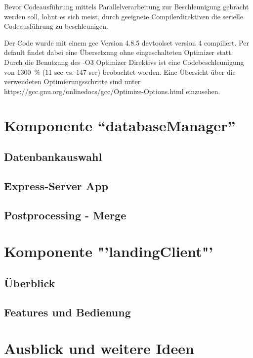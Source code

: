 \documentclass[10pt,a4paper]{report}
\begin{document}
Bevor Codeausführung mittels Parallelverarbeitung zur Beschleunigung gebracht werden soll, lohnt es sich meist, durch geeignete Compilerdirektiven die serielle Codeausführung zu beschleunigen.

Der Code wurde mit einem gcc Version 4.8.5 devtoolset version 4 compiliert. Per default findet dabei eine Übersetzung ohne eingeschalteten Optimizer statt. 
Durch die Benutzung des -O3 Optimizer Direktivs ist eine Codebeschleunigung von 1300~\% (11 sec vs. 147 sec) beobachtet worden. 
Eine Übersicht über die verwendeten Optimierungsschritte sind unter https://gcc.gnu.org/onlinedocs/gcc/Optimize-Options.html einzusehen.

\chapter{Komponente "`databaseManager"'}


\section{Datenbankauswahl}
\section{Express-Server App}
\section{Postprocessing - Merge}

\chapter{Komponente "'landingClient"'}
\section{Überblick}
\section{Features und Bedienung}
  
\chapter{Ausblick und weitere Ideen}
\end{document}
